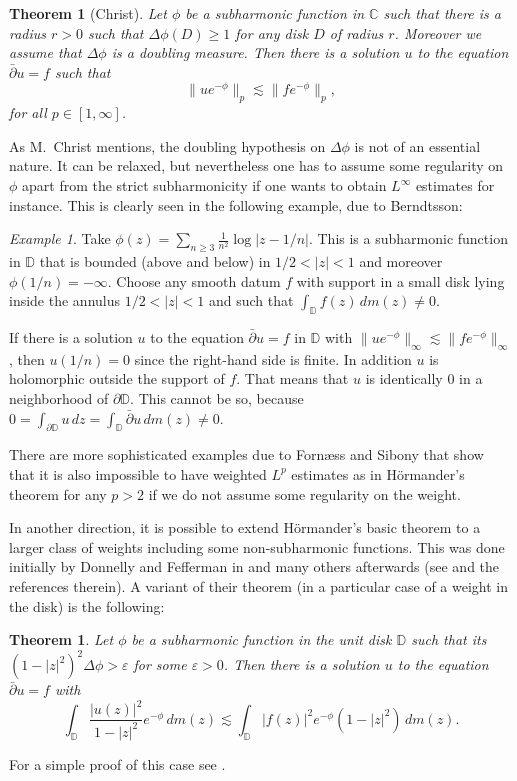 \documentclass[12pt,twoside,final,psamsfonts]{amsart}
\theoremstyle{plain}
\newtheorem*{teor*}{Theorem}
\newtheorem{teor}{Theorem}
\theoremstyle{remark}
\newtheorem*{example}{Example}
\theoremstyle{definition}
\newcommand{\C}{{\mathbb C}}
\newcommand{\D}{{\mathbb D}}
\newcommand{\dbar}{\bar\partial}
\begin{document}
\begin{teor}[Christ]\label{Christ}
Let $\phi$ be a subharmonic function in $\C$ such that  there is a radius $r>0$ 
such that $\Delta\phi (D)\ge
1$ for any disk $D$ of radius $r$. Moreover we assume that $\Delta\phi$ is a
doubling measure. Then there is a  solution $u$ to the equation $\dbar u=f$
such that
\[
\|ue^{-\phi}\|_p\lesssim \|fe^{-\phi}\|_p,
\] 
for all $p\in[1,\infty]$. 
\end{teor}

As M.~Christ mentions, the doubling hypothesis on $\Delta \phi$ is not of an
essential  nature. It can be relaxed, but nevertheless one has to assume some
regularity on $\phi$ apart from the strict subharmonicity if one wants to
obtain $L^\infty$ estimates for instance. This is clearly seen in the following
example, due to Berndtsson:

\begin{example} 
Take $\phi(z)=\sum_{n\ge 3} \frac 1{n^2} \log|z-1/n|$. This is a  subharmonic
function in $\D$ that is bounded (above and below) in $1/2<|z|<1$ and moreover
$\phi(1/n)=-\infty$. Choose any smooth datum $f$ with support in a small disk
lying inside the annulus $1/2<|z|<1$ and such that $\int_{\D} f(z)\,dm(z)\ne 0$.

If there is a solution $u$ to the equation $\dbar u=f$ in $\D$ with 
 $\|ue^{-\phi} \|_\infty\lesssim \|fe^{-\phi}\|_\infty$, then 
$u(1/n)=0$ since the right-hand side is finite. In addition $u$ is
holomorphic outside the support of $f$. That means that $u$ is identically $0$
in a neighborhood of $\partial \D$. This cannot be so, 
because $0=\int_{\partial
\D} u\, dz= \int_{\D} \dbar u\, dm(z)\ne 0$.   
\end{example} 

There are more sophisticated examples due to Forn{\ae}ss and Sibony
\cite{ForSib89} that show that it is also impossible to have weighted $L^p$
estimates as in H\"ormander's theorem for any $p>2$ if we do not assume some
regularity on the weight.

In another direction, it is possible to extend H\"ormander's basic theorem to a 
larger class of weights including some non-subharmonic functions. This was done 
initially by Donnelly and Fefferman in \cite{DonFef83} and many others
afterwards (see \cite{BerCha99} and the references therein).  A variant of
their theorem  (in a particular case of a weight in the disk) is the following:

\begin{teor*}
Let $\phi$ be a subharmonic function in the unit disk $\D$ such that its
$(1-|z|^2)^2\Delta\phi>\varepsilon$ for some
$\varepsilon>0$.  Then there is  a solution $u$ to the equation $\dbar u=f$
with
\[
\int_{\D} \frac {|u(z)|^2 }{1-|z|^2}e^{-\phi}\, dm(z)
\lesssim
\int_{\D}  |f(z)|^2 e^{-\phi}(1-|z|^2)\, dm(z).
\]
\end{teor*}
For a simple proof of this case see \cite{BerOrt95}.
\end{document}
